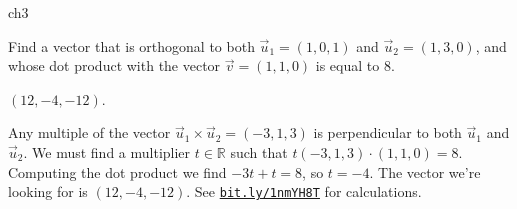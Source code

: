 {\begin{problems}{ch3}
	\begin{problem}
		Find a vector that is orthogonal to both $\vec{u}_1 = (1, 0, 1)$ and $\vec{u}_2 =(1, 3, 0)$, 
		 and whose dot product with the vector  $\vec{v}= (1, 1, 0)$ is equal to $8$.
		\begin{answer}$(12, -4, -12)$.\end{answer}
		\begin{solution}
			Any multiple of the vector $\vec{u}_1 \times \vec{u}_2 = (-3,1,3)$ 
			is perpendicular to both $\vec{u}_1$ and 	$\vec{u}_2$.
			We must find a multiplier $t \in \mathbb{R}$ such that 
			$t(-3,1,3) \cdot (1, 1, 0) = 8$.
			Computing the dot product we find $-3t + t = 8$, so $t=-4$.
			The vector we're looking for is $(12, -4, -12)$.
			See \href{http://bit.ly/1nmYH8T}{\texttt{bit.ly/1nmYH8T}} for calculations.
		\end{solution}
	\end{problem}


\end{problems}

} %

